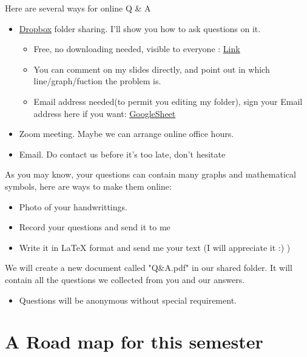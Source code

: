 \documentclass{article}
\begin{document}
Here are several ways for online Q \& A 
\begin{itemize}
\item \href{https://www.dropbox.com/referrals/AACx30a_-sudYoShl6zfNAQGKT2agvs-2wY?src=global9}{Dropbox} folder sharing. I'll show you how to ask questions on it.

\begin{itemize}
\item Free, no downloading needed, visible to everyone : \href{https://www.dropbox.com/sh/a7igfgfgwwsx1w5/AABlcL6h_JBGl-AZDJCHyP6ga?dl=0}{Link}
\item You can comment on my slides directly, and point out in which line/graph/fuction the problem is.
\item Email address needed(to permit you editing my folder), sign your Email address here if you want: \href{https://docs.google.com/spreadsheets/d/1pNukxmwu8BX5blj0uOcLB7XxZX7gxgjpQsle1yO1vZI/edit?usp=sharing}{GoogleSheet}
\end{itemize}

\item Zoom meeting. Maybe we can arrange online office hours.
\item Email. Do contact us before it's too late, don't hesitate
\end{itemize}

\bigskip

As you may know, your questions can contain many graphs and mathematical symbols, here are ways to make them online:

\begin{itemize}
\item Photo of your handwrittings.
\item Record your questions and send it to me
\item Write it in \LaTeX{} format and send me your text (I will appreciate it :) )
\end{itemize}

\bigskip

We will create a new document called "Q\&A.pdf" in our shared folder. It will contain all the questions we collected from you and our answers.
\begin{itemize}
\item Questions will be anonymous without special requirement.
\end{itemize}

\newpage

\section*{A Road map for this semester}
\end{document}
